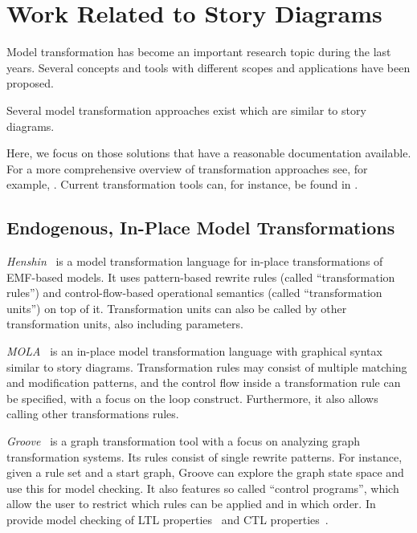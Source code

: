 \section{Work Related to Story Diagrams}
\label{sec:RW_RelatedWork}

Model transformation has become an important research topic during the last years.
Several concepts and tools with different scopes and applications have been proposed.

Several model transformation approaches exist which are similar to story diagrams.

Here, we focus on those solutions that have a reasonable documentation available.
For a more comprehensive overview of transformation approaches see, for example, \cite{Czarnecki06}.
Current transformation tools can, for instance, be found in \cite{TTC2010}.

\subsection{Endogenous, In-Place Model Transformations}

\emph{Henshin}~\cite{henshin2} is a model transformation language for in-place transformations of EMF-based models.
It uses pattern-based rewrite rules (called ``transformation rules'') and control-flow-based operational semantics (called ``transformation units'') on top of it.
Transformation units can also be called by other transformation units, also including parameters.

\emph{MOLA}~\cite{mola} is an in-place model transformation language with graphical syntax similar to story diagrams.
Transformation rules may consist of multiple matching and modification patterns, and the control flow inside a transformation rule can be specified, with a focus on the loop construct.
Furthermore, it also allows calling other transformations rules. %

\emph{Groove}~\cite{Ren04a} is a graph transformation tool with a focus on analyzing graph transformation systems.
Its rules consist of single rewrite patterns.
For instance, given a rule set and a start graph, Groove can explore the graph state space and use this for model checking.
It also features so called ``control programs'', which allow the user to restrict which rules can be applied and in which order. In provide model checking of LTL properties~\cite{Ren08} and CTL properties~\cite{KR06}.

